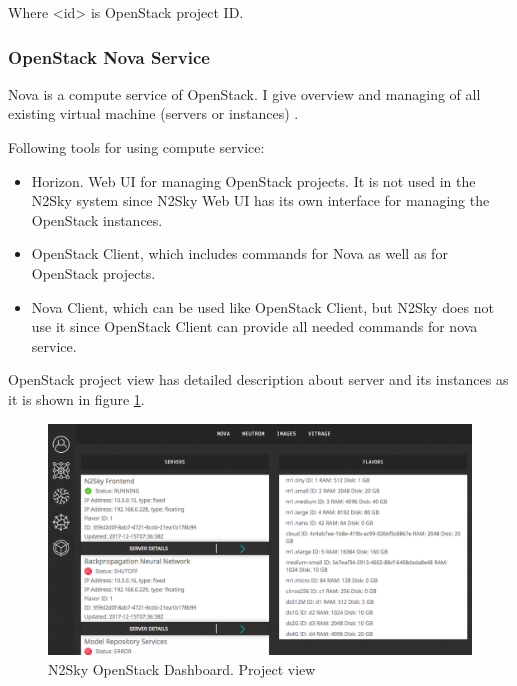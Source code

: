 Where <id> is OpenStack project ID.

\subsubsection{OpenStack Nova Service}\label{OpenStack Nova Service}

Nova is a compute service of OpenStack. I give overview and managing of all existing virtual machine (servers or instances) \cite{Markelov2016}. 

Following tools for using compute service:
\begin{itemize}
\item Horizon. Web UI for managing OpenStack projects. It is not used in the N2Sky system since N2Sky Web UI has its own interface for managing the OpenStack instances.
\item OpenStack Client, which includes commands for Nova as well as for OpenStack projects.
\item Nova Client, which can be used like OpenStack Client, but N2Sky does not use it since OpenStack Client can provide all needed commands for nova service. 
\end{itemize}


OpenStack project view has detailed description about server and its instances as it is shown in figure \ref{fig:openstack_project_view}. 

\begin{figure}[htbp]
\begin{center}
  \includegraphics[width=\linewidth]{components/4/pics/openstack_project_view.png}
  \caption{N2Sky OpenStack Dashboard. Project view}
  \label{fig:openstack_project_view}
\end{center}
\end{figure}


